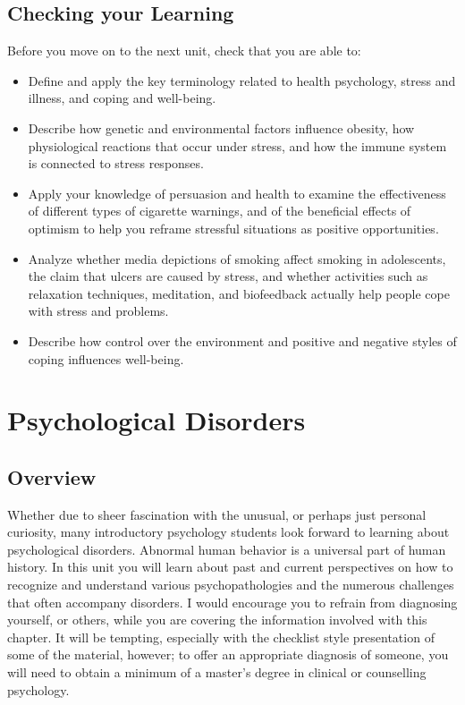 \documentclass[
]{book}
\begin{document}
\hypertarget{checking-your-learning-7}{%
\section*{Checking your Learning}\label{checking-your-learning-7}}

\begin{progress}
Before you move on to the next unit, check that you are able to:

\begin{itemize}
\item
  Define and apply the key terminology related to health psychology, stress and illness, and coping and well-being.
\item
  Describe how genetic and environmental factors influence obesity, how physiological reactions that occur under stress, and how the immune system is connected to stress responses.
\item
  Apply your knowledge of persuasion and health to examine the effectiveness of different types of cigarette warnings, and of the beneficial effects of optimism to help you reframe stressful situations as positive opportunities.
\item
  Analyze whether media depictions of smoking affect smoking in adolescents, the claim that ulcers are caused by stress, and whether activities such as relaxation techniques, meditation, and biofeedback actually help people cope with stress and problems.
\item
  Describe how control over the environment and positive and negative styles of coping influences well-being.
\end{itemize}
\end{progress}

\hypertarget{psychological-disorders}{%
\chapter{Psychological Disorders}\label{psychological-disorders}}

\hypertarget{overview-8}{%
\section*{Overview}\label{overview-8}}

Whether due to sheer fascination with the unusual, or perhaps just personal curiosity, many introductory psychology students look forward to learning about psychological disorders. Abnormal human behavior is a universal part of human history. In this unit you will learn about past and current perspectives on how to recognize and understand various psychopathologies and the numerous challenges that often accompany disorders. I would encourage you to refrain from diagnosing yourself, or others, while you are covering the information involved with this chapter. It will be tempting, especially with the checklist style presentation of some of the material, however; to offer an appropriate diagnosis of someone, you will need to obtain a minimum of a master's degree in clinical or counselling psychology.
\end{document}
